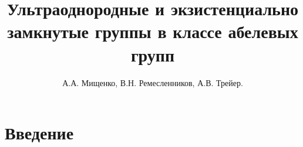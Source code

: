 \documentclass{article} %
\title{Ультраоднородные и экзистенциально замкнутые группы в классе абелевых групп}
\author{А.А. Мищенко, В.Н. Ремесленников, А.В. Трейер.}
\begin{document}
\maketitle
\tableofcontents

\section{Введение}
\end{document}
